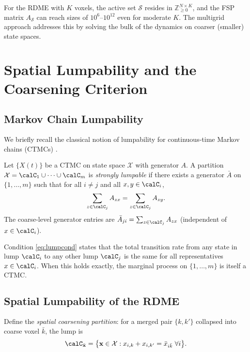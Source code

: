 \documentclass[review,onefignum,onetabnum]{siamart171218}
\newcommand{\bx}{\mathbf{x}}
\newcommand{\Znn}{\mathbb{Z}_{\geq 0}}
\newcommand{\calX}{\mathcal{X}}
\newcommand{\calS}{\mathcal{S}}
\begin{document}
For the RDME with $K$ voxels, the active set $\calS$ resides in
$\Znn^{N \times K}$, and the FSP matrix $A_{\calS}$ can reach
sizes of $10^6$--$10^{12}$ even for moderate $K$.  The multigrid
approach addresses this by solving the bulk of the dynamics on
coarser (smaller) state spaces.

\section{Spatial Lumpability and the Coarsening Criterion}
\label{sec:lumpability}

\subsection{Markov Chain Lumpability}

We briefly recall the classical notion of lumpability for
continuous-time Markov chains (CTMCs) \cite{kemeny_snell_1960}.

\begin{definition}
  \label{def:lumpability}
  Let $\{X(t)\}$ be a CTMC on state space $\calX$ with generator
  $A$.  A partition $\calX = \calC_1 \cup \cdots \cup \calC_m$ is
  \emph{strongly lumpable} if there exists a generator $\bar{A}$
  on $\{1,\ldots,m\}$ such that for all $i \neq j$ and all
  $x, y \in \calC_i$,
  \begin{equation}
    \label{eq:lumpcond}
    \sum_{z \in \calC_j} A_{zx} = \sum_{z \in \calC_j} A_{zy}.
  \end{equation}
  The coarse-level generator entries are $\bar{A}_{ji} =
  \sum_{z \in \calC_j} A_{zx}$ (independent of $x \in \calC_i$).
\end{definition}

Condition \eqref{eq:lumpcond} states that the total transition
rate from any state in lump $\calC_i$ to any other lump $\calC_j$
is the same for all representatives $x \in \calC_i$.  When this
holds exactly, the marginal process on $\{1,\ldots,m\}$ is itself
a CTMC.

\subsection{Spatial Lumpability of the RDME}
\label{sec:spatial-lump}

Define the \emph{spatial coarsening partition}: for a merged
pair $\{k, k'\}$ collapsed into coarse voxel $\bar{k}$, the
lump is
\begin{equation}
  \calC_{\bar{\bx}} = \bigl\{ \bx \in \calX :
    x_{i,k} + x_{i,k'} = \bar{x}_{i\bar{k}}\;\forall i \bigr\}.
\end{equation}
\end{document}
